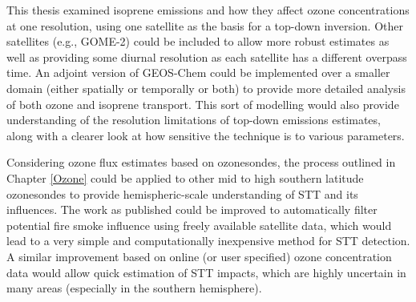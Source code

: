   This thesis examined isoprene emissions and how they affect ozone concentrations at one resolution, using one satellite as the basis for a top-down inversion.
  Other satellites (e.g., GOME-2) could be included to allow more robust estimates as well as providing some diurnal resolution as each satellite has a different overpass time.
  An adjoint version of GEOS-Chem could be implemented over a smaller domain (either spatially or temporally or both) to provide more detailed analysis of both ozone and isoprene transport.
  This sort of modelling would also provide understanding of the resolution limitations of top-down emissions estimates, along with a clearer look at how sensitive the technique is to various parameters.
  
  Considering ozone flux estimates based on ozonesondes, the process outlined in Chapter \ref{Ozone} could be applied to other mid to high southern latitude ozonesondes to provide hemispheric-scale understanding of STT and its influences.
  The work as published could be improved to automatically filter potential fire smoke influence using freely available satellite data, which would lead to a very simple and computationally inexpensive method for STT detection.
  A similar improvement based on online (or user specified) ozone concentration data would allow quick estimation of STT impacts, which are highly uncertain in many areas (especially in the southern hemisphere).
  
